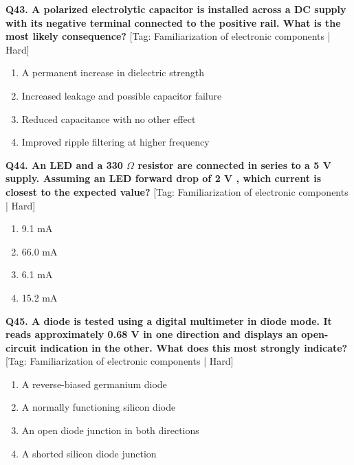 \noindent\textbf{Q43. A polarized electrolytic capacitor is installed across a DC supply with its negative terminal connected to the positive rail. What is the most likely consequence?} \hfill [Tag: Familiarization of electronic components | Hard]
\begin{enumerate}[label=(\alph*),topsep=2pt,itemsep=1pt,partopsep=0pt,parsep=0pt]
    \item {A permanent increase in dielectric strength}
    \item {Increased leakage and possible capacitor failure}
    \item {Reduced capacitance with no other effect}
    \item {Improved ripple filtering at higher frequency}
\end{enumerate}
\vspace{2mm}

\noindent\textbf{Q44. An LED and a 330 $\Omega$ resistor are connected in series to a 5 V supply. Assuming an LED forward drop of 2 V , which current is closest to the expected value?} \hfill [Tag: Familiarization of electronic components | Hard]
\begin{enumerate}[label=(\alph*),topsep=2pt,itemsep=1pt,partopsep=0pt,parsep=0pt]
    \item {9.1 mA}
    \item {66.0 mA}
    \item {6.1 mA}
    \item {15.2 mA}
\end{enumerate}
\vspace{2mm}

\noindent\textbf{Q45. A diode is tested using a digital multimeter in diode mode. It reads approximately 0.68 V in one direction and displays an open-circuit indication in the other. What does this most strongly indicate?} \hfill [Tag: Familiarization of electronic components | Hard]
\begin{enumerate}[label=(\alph*),topsep=2pt,itemsep=1pt,partopsep=0pt,parsep=0pt]
    \item {A reverse-biased germanium diode}
    \item {A normally functioning silicon diode}
    \item {An open diode junction in both directions}
    \item {A shorted silicon diode junction}
\end{enumerate}
\vspace{2mm}

